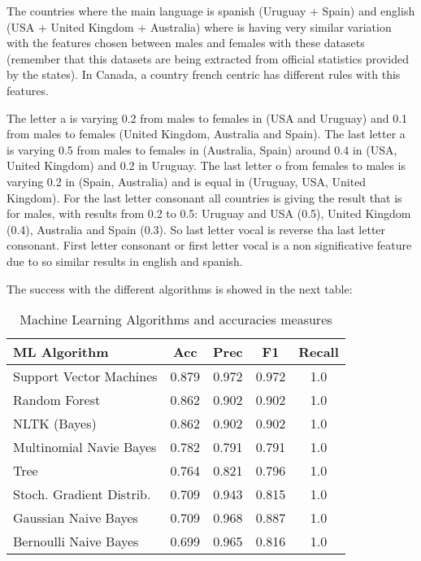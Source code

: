 \documentclass[a4paper]{article}
\begin{document}
The countries where the main language is spanish (Uruguay + Spain) and
english (USA + United Kingdom + Australia) where is having very
similar variation with the features chosen between males and females
with these datasets (remember that this datasets are being extracted
from official statistics provided by the states). In Canada, a country
french centric has different rules with this features.

The letter a is varying 0.2 from males to females in (USA and Uruguay)
and 0.1 from males to females (United Kingdom, Australia and
Spain). The last letter a is varying 0.5 from males to females in
(Australia, Spain) around 0.4 in (USA, United Kingdom) and 0.2 in
Uruguay. The last letter o from females to males is varying 0.2 in
(Spain, Australia) and is equal in (Uruguay, USA, United Kingdom). For
the last letter consonant all countries is giving the result that is
for males, with results from 0.2 to 0.5: Uruguay and USA (0.5), United
Kingdom (0.4), Australia and Spain (0.3). So last letter vocal is
reverse tha last letter consonant. First letter consonant or first
letter vocal is a non significative feature due to so similar results
in english and spanish.

The success with the different algorithms is showed in the next table:

\begin{table}
\footnotesize
\begin{tabular}[]{lcccc}
  \hline
  ML Algorithm & Acc & Prec & F1 & Recall \tabularnewline
  \hline
 Support Vector Machines             &    0.879 &     0.972 &   0.972 &    1.0  \tabularnewline
 Random Forest                       &    0.862 &     0.902 &   0.902 &    1.0  \tabularnewline
 NLTK (Bayes)                        &    0.862 &     0.902 &   0.902 &    1.0  \tabularnewline
 Multinomial Navie Bayes             &    0.782 &     0.791 &   0.791 &    1.0  \tabularnewline
 Tree                                &    0.764 &     0.821 &   0.796 &    1.0  \tabularnewline
 Stoch. Gradient Distrib.    &    0.709 &     0.943 &   0.815 &    1.0  \tabularnewline
 Gaussian Naive Bayes                &    0.709 &     0.968 &   0.887 &    1.0  \tabularnewline
 Bernoulli Naive Bayes               &    0.699 &     0.965 &   0.816 &    1.0  \tabularnewline
 
\hline
\end{tabular}
\caption{Machine Learning Algorithms and accuracies measures}
\label{table:MLAccuracies}
\end{table}
\end{document}
